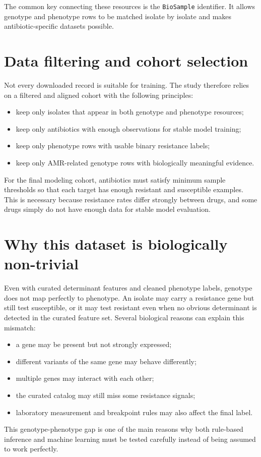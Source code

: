 The common key connecting these resources is the \texttt{BioSample} identifier. It allows genotype and phenotype rows to be matched isolate by isolate and makes antibiotic-specific datasets possible.

\section{Data filtering and cohort selection}

Not every downloaded record is suitable for training. The study therefore relies on a filtered and aligned cohort with the following principles:

\begin{itemize}
    \item keep only isolates that appear in both genotype and phenotype resources;
    \item keep only antibiotics with enough observations for stable model training;
    \item keep only phenotype rows with usable binary resistance labels;
    \item keep only AMR-related genotype rows with biologically meaningful evidence.
\end{itemize}

For the final modeling cohort, antibiotics must satisfy minimum sample thresholds so that each target has enough resistant and susceptible examples. This is necessary because resistance rates differ strongly between drugs, and some drugs simply do not have enough data for stable model evaluation.

\section{Why this dataset is biologically non-trivial}

Even with curated determinant features and cleaned phenotype labels, genotype does not map perfectly to phenotype. An isolate may carry a resistance gene but still test susceptible, or it may test resistant even when no obvious determinant is detected in the curated feature set. Several biological reasons can explain this mismatch:

\begin{itemize}
    \item a gene may be present but not strongly expressed;
    \item different variants of the same gene may behave differently;
    \item multiple genes may interact with each other;
    \item the curated catalog may still miss some resistance signals;
    \item laboratory measurement and breakpoint rules may also affect the final label.
\end{itemize}

This genotype-phenotype gap is one of the main reasons why both rule-based inference and machine learning must be tested carefully instead of being assumed to work perfectly.
